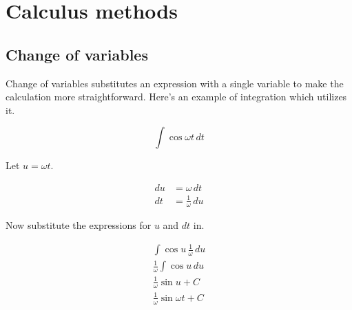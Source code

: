 \chapter{Calculus methods}

\section{Change of variables}
\label{sec:calculus_change_of_vars}

Change of variables substitutes an expression with a single variable to make the
calculation more straightforward. Here's an example of integration which
utilizes it.

\begin{equation*}
  \int \cos\omega t \,dt
\end{equation*}

Let $u = \omega t$.

\begin{align*}
  du &= \omega \,dt \\
  dt &= \frac{1}{\omega} \,du
\end{align*}

Now substitute the expressions for $u$ and $dt$ in.

\begin{align*}
  \int \cos u \,\frac{1}{\omega} \,du \\
  \frac{1}{\omega} \int \cos u \,du \\
  \frac{1}{\omega} \sin u + C \\
  \frac{1}{\omega} \sin\omega t + C
\end{align*}
